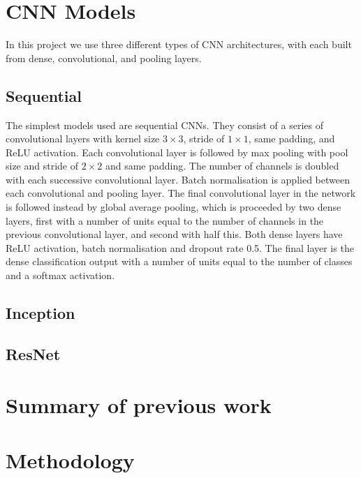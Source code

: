 \documentclass[12pt]{article}
\begin{document}
\section{CNN Models}
In this project we use three different types of CNN architectures, with each built from dense, convolutional, and pooling layers.

\subsection{Sequential}
The simplest models used are sequential CNNs. They consist of a series of convolutional layers with kernel size $3\times3$, stride of $1\times1$, same padding, and ReLU activation. Each convolutional layer is followed by max pooling with pool size and stride of $2\times2$ and same padding. The number of channels is doubled with each successive convolutional layer. Batch normalisation is applied between each convolutional and pooling layer. The final convolutional layer in the network is followed instead by global average pooling, which is proceeded by two dense layers, first with a number of units equal to the number of channels in the previous convolutional layer, and second with half this. Both dense layers have ReLU activation, batch normalisation and dropout rate 0.5. The final layer is the dense classification output with a number of units equal to the number of classes and a softmax activation. 

\subsection{Inception}


\subsection{ResNet}

\section{Summary of previous work}

\section{Methodology}
\end{document}
